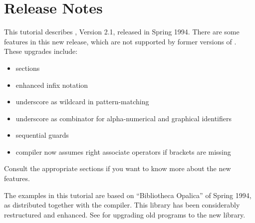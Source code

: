 %


\section{Release Notes}
\label{sec:releasenotes}
\experienced This  tutorial describes \opal,  Version 2.1, released in
Spring 1994. 
There are some features in this new release, which are not supported
by former versions of \opal.  
These upgrades include:
\begin{itemize}
\item sections
\item enhanced infix notation
\item underscore as wildcard in pattern-matching
\item underscore as combinator for alpha-numerical and graphical
  identifiers
\item sequential guards
\item compiler now assumes right associate operators if brackets are missing
\end{itemize}

\noindent Consult the appropriate sections if you want to know more
about the new features.

 The examples in this tutorial are based on ``Bibliotheca Opalica''
of Spring 1994, as distributed together with the compiler.
This library has been considerably restructured and enhanced. 
See \cite{Di} for upgrading old programs to the new library.



